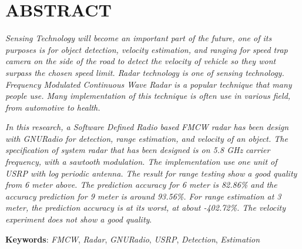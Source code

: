 
\chapter*{ABSTRACT}
\vspace*{0.7cm}

\textit{Sensing Technology will become an important part of the future, one of its purposes is for object detection, velocity estimation, and ranging for speed trap camera on the side of the road to detect the velocity of vehicle so they wont surpass the chosen speed limit. Radar technology is one of sensing technology. Frequency Modulated Continuous Wave Radar is a popular technique that many people use. Many implementation of this technique is often use in various field, from automotive to health.}

\textit{In this research, a Software Defined Radio based FMCW radar has been design with GNURadio for detection, range estimation, and velocity of an object. The specification of system radar that has been designed is on 5.8 GHz carrier frequency, with a sawtooth modulation. The implementation use one unit of USRP with log periodic antenna. The result for range testing show a good quality from 6 meter above. The prediction accuracy for 6 meter is 82.86\% and the accuracy prediction for 9 meter is around 93.56\%. For range estimation at 3 meter, the prediction accuracy is at its worst, at about -402.72\%. The velocity experiment does not show a good quality}.

\noindent \textbf{Keywords}: \textit{FMCW}, \textit{Radar}, \textit{GNURadio}, \textit{USRP}, \textit{Detection}, \textit{Estimation}\\ 
\newpage